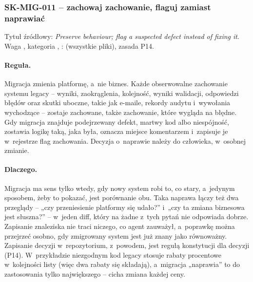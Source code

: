 \subsubsection{SK-MIG-011 -- zachowaj zachowanie, flaguj zamiast naprawiać}\label{sec:standardy-sk-mig-011}

Tytuł źródłowy: \emph{Preserve behaviour; flag a suspected defect instead of fixing it}. Waga
, kategoria , : 
(wszystkie pliki), zasada P14.

\paragraph{Reguła.} Migracja zmienia platformę, a~nie biznes. Każde obserwowalne zachowanie
systemu legacy -- wyniki, zaokrąglenia, kolejność, wyniki walidacji, odpowiedzi błędów oraz
skutki uboczne, takie jak e-maile, rekordy audytu i~wywołania wychodzące -- zostaje
zachowane, także zachowanie, które wygląda na błędne. Gdy migracja znajduje podejrzewany
defekt, martwy kod albo niespójność, zostawia logikę taką, jaka była, oznacza miejsce
komentarzem  i~zapisuje je w~rejestrze flag zachowania. Decyzja
o~naprawie należy do człowieka, w~osobnej zmianie.

\paragraph{Dlaczego.} Migracja ma sens tylko wtedy, gdy nowy system robi to, co stary,
a~jedynym sposobem, żeby to pokazać, jest porównanie obu.  Taka naprawa łączy też dwa przeglądy -- „czy przeniesienie platformy się
udało?” i~„czy ta zmiana biznesowa jest słuszna?” -- w~jeden diff, który na żadne z~tych
pytań nie odpowiada dobrze. Zapisanie znaleziska nie traci niczego, co agent zauważył,
a~poprawkę można przejrzeć osobno, gdy zmigrowany system jest już znany jako równoważny.
Zapisanie decyzji w~repozytorium, z~powodem, jest regułą konstytucji dla decyzji (P14).
W~przykładzie niezgodnym kod legacy stosuje rabaty procentowe w~kolejności listy (więc dwa
rabaty się składają), a~migracja „naprawia” to do zastosowania tylko największego -- cicha
zmiana każdej ceny.


